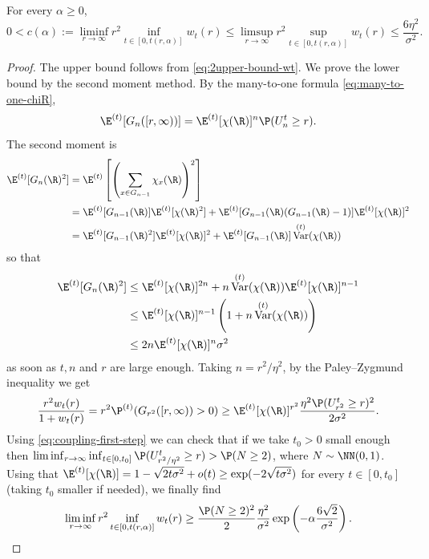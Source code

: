 \documentclass[10pt,a4paper]{article}
\DeclareMathOperator{\Var}{Var}
\begin{document}
\begin{lemma}\label{lem:positivity-c-alpha}
For every $\alpha\geq 0$, 
\[ 0 < c(\alpha) := \liminf_{r\to\infty} r^2 \inf_{t\in[0,t(r,\alpha)]} w_t(r) \leq \limsup_{r\to\infty} r^2 \sup_{t\in[0,t(r,\alpha)]} w_t(r) \leq \frac{6\eta^2}{\sigma^2} . \]
\end{lemma}

\begin{proof}
The upper bound follows from \eqref{eq:2upper-bound-wt}. 
We prove the lower bound by the second moment method. By the many-to-one formula \eqref{eq:many-to-one-chiR}, 
\[ \E^{(t)}[G_n([r, \infty))] = \E^{(t)}[\chi(\R)]^n \P(U^t_n \geq r) . \]
The second moment is
\begin{align*}
\E^{(t)}[G_n(\R)^2] 
&= \E^{(t)}\left[ \left(\sum_{x\in G_{n-1}} \chi_x(\R)\right)^2\right] \\
&= \E^{(t)}[G_{n-1}(\R)] \E^{(t)}[\chi(\R)^2] + \E^{(t)}[G_{n-1}(\R)(G_{n-1}(\R)-1)] \E^{(t)}[\chi(\R)]^2 \\
&= \E^{(t)}[G_{n-1}(\R)^2] \E^{(t)}[\chi(\R)]^2 + \E^{(t)}[G_{n-1}(\R)] \Var^{(t)}(\chi(\R))
\end{align*}
so that
\begin{align}\label{eq:second-moment-Gr2}
\E^{(t)}[G_n(\R)^2] &\leq \E^{(t)}[\chi(\R)]^{2n} + n\Var^{(t)}(\chi(\R)) \E^{(t)}[\chi(\R)]^{n-1} \\
&\nonumber \leq \E^{(t)}[\chi(\R)]^{n-1}\left(1+n\Var^{(t)}(\chi(\R))\right) \\
&\nonumber \leq 2n\E^{(t)}[\chi(\R)]^{n}\sigma^2 
\end{align}
as soon as $t, n$ and $r$ are large enough. Taking $n = r^2/\eta^2$, by the Paley--Zygmund inequality we get
\begin{equation*}
\frac{r^2 w_t(r)}{1+w_t(r)} = r^2 \P^{(t)}(G_{r^2}([r,\infty))>0) \geq \E^{(t)}[\chi(\R)]^{r^2} \frac{\eta^2 \P(U_{r^2}^t \geq r)^2}{2\sigma^2} .
\end{equation*}
Using \eqref{eq:coupling-first-step} we can check that if we take $t_0>0$ small enough then $\liminf_{r\to\infty} \inf_{t\in [0,t_0]} \P(U_{r^2/\eta^2}^t \geq r) > \P(N\geq 2)$, where $N\sim \NN(0,1)$.  
Using that $\E^{(t)}[\chi(\R)] = 1 - \sqrt{2t\sigma^2} + o(t) \geq \exp( - 2\sqrt{t\sigma^2})$ for every $t\in [0,t_0]$ (taking $t_0$ smaller if needed), we finally find 
\[ \liminf_{r\to\infty} r^2 \inf_{t\in [0, t(r,\alpha)]} w_t(r) \geq \frac{\P(N\geq 2)^2}{2}\frac{\eta^2}{\sigma^2} \exp\left(-\alpha\frac{6\sqrt{2}}{\sigma^2} \right) . \]
\end{proof}
\end{document}

